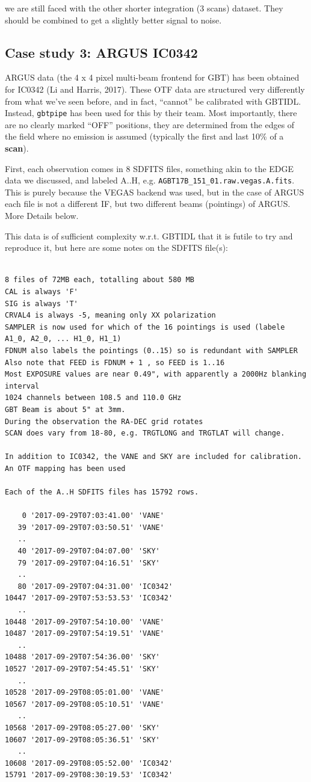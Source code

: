 \documentclass[12pt,a4paper]{article}
\begin{document}
we are still faced with the other shorter integration (3 scans) dataset. They should be combined to get a
slightly better signal to noise.

\subsection{Case study 3: ARGUS IC0342}

ARGUS data (the 4 x 4 pixel multi-beam frontend for GBT) has been
obtained for IC0342 (Li and Harris, 2017). These OTF data are structured very
differently from what we've seen before, and in fact, ``cannot'' be
calibrated with GBTIDL.  Instead, {\tt gbtpipe} has been used for this by their team.
Most importantly, there are no clearly marked ``OFF'' positions, they are determined from the
edges of the field where no emission is assumed (typically the first and last 10\% of a {\bf scan}).

First, each observation comes in 8 SDFITS
files, something akin to the EDGE data we discussed, and labeled A..H,
e.g. {\tt AGBT17B\_151\_01.raw.vegas.A.fits}. This is purely because the VEGAS backend
was used, but in the case of ARGUS each file is not a different IF, but two different
beams (pointings) of ARGUS.  More Details below.

\bigskip
This data is of sufficient complexity w.r.t. GBTIDL that it is futile to try and reproduce it,
but here are some notes on the SDFITS file(s):

\footnotesize
\begin{verbatim}

8 files of 72MB each, totalling about 580 MB
CAL is always 'F'
SIG is always 'T'
CRVAL4 is always -5, meaning only XX polarization
SAMPLER is now used for which of the 16 pointings is used (labele A1_0, A2_0, ... H1_0, H1_1)
FDNUM also labels the pointings (0..15) so is redundant with SAMPLER
Also note that FEED is FDNUM + 1 , so FEED is 1..16
Most EXPOSURE values are near 0.49", with apparently a 2000Hz blanking interval
1024 channels between 108.5 and 110.0 GHz
GBT Beam is about 5" at 3mm.
During the observation the RA-DEC grid rotates
SCAN does vary from 18-80, e.g. TRGTLONG and TRGTLAT will change.

In addition to IC0342, the VANE and SKY are included for calibration.
An OTF mapping has been used

Each of the A..H SDFITS files has 15792 rows.

    0 '2017-09-29T07:03:41.00' 'VANE'
   39 '2017-09-29T07:03:50.51' 'VANE'
   ..
   40 '2017-09-29T07:04:07.00' 'SKY'
   79 '2017-09-29T07:04:16.51' 'SKY'
   ..
   80 '2017-09-29T07:04:31.00' 'IC0342'
10447 '2017-09-29T07:53:53.53' 'IC0342'
   ..
10448 '2017-09-29T07:54:10.00' 'VANE'
10487 '2017-09-29T07:54:19.51' 'VANE'
   ..
10488 '2017-09-29T07:54:36.00' 'SKY'
10527 '2017-09-29T07:54:45.51' 'SKY'
   ..
10528 '2017-09-29T08:05:01.00' 'VANE'
10567 '2017-09-29T08:05:10.51' 'VANE'
   ..
10568 '2017-09-29T08:05:27.00' 'SKY'
10607 '2017-09-29T08:05:36.51' 'SKY'
   ..
10608 '2017-09-29T08:05:52.00' 'IC0342'
15791 '2017-09-29T08:30:19.53' 'IC0342'

\end{verbatim}
\normalsize
\end{document}
